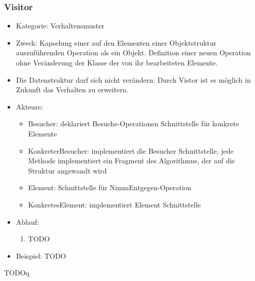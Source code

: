 \documentclass[11pt, fleqn, a4paper, leqno]{scrartcl} %
\begin{document}
		\subsubsection{Visitor}
			\begin{itemize}
				\item Kategorie: Verhaltensmuster
				\item Zweck: Kapselung einer auf den Elementen einer Objektstruktur auszuführenden Operation als ein Objekt. Definition einer neuen Operation ohne Veränderung der Klasse der von ihr bearbeiteten Elemente.
				\item Die Datenstruktur darf sich nicht verändern. Durch Vistor ist es möglich in Zukunft das Verhalten zu erweitern.
				\item Akteure: 
					\begin{itemize}
						\item Besucher: deklariert Besuche-Operationen Schnittstelle für konkrete Elemente
						\item KonkreterBesucher: implementiert die Besucher Schnittstelle, jede Methode implementiert ein Fragment des Algorithmus, der auf die Struktur angewandt wird
						\item Element: Schnittstelle für NimmEntgegen-Operation
						\item KonkretesElement: implementiert Element Schnittstelle
					\end{itemize}
				\item Ablauf:
					\begin{enumerate}
						\item TODO
					\end{enumerate}
				\item Beispiel:	 TODO		
			\end{itemize}
			TODOq
			\newpage
\end{document}
